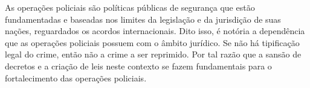As operações policiais são políticas públicas de segurança que estão fundamentadas e baseadas nos limites da legislação e da jurisdição de suas nações, reguardados os acordos internacionais. Dito isso, é notória a dependência que as operações policiais possuem com o âmbito jurídico. Se não há tipificação legal do crime, então não a crime a ser reprimido. Por tal razão que a sansão de decretos e a criação de leis neste contexto se fazem fundamentais para o fortalecimento das operações policiais. 












